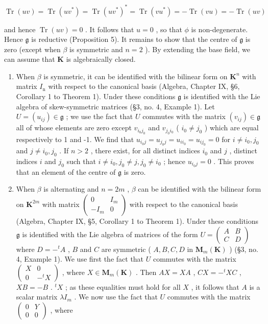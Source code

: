 \[
\operatorname{Tr} (u v) = \operatorname{Tr} (u v ^ {*}) = \operatorname{Tr} (u v ^ {*}) ^ {*} = \operatorname{Tr} (v u ^ {*}) = - \operatorname{Tr} (v u) = - \operatorname{Tr} (u v)
\]

and hence \(\operatorname{Tr}(u v) = 0\) . It follows that \(u = 0\) , so that \(\phi\) is non-degenerate. Hence \(\mathfrak{g}\) is reductive (Proposition 5). It remains to show that the centre of \(\mathfrak{g}\) is zero (except when \(\beta\) is symmetric and \(n = 2\) ). By extending the base field, we can assume that \(\mathbf{K}\) is algebraically closed.

\begin{enumerate}
\def\labelenumi{(\alph{enumi})}
\item
  When \(\beta\) is symmetric, it can be identified with the bilinear form on \(\mathbf{K}^n\) with matrix \(I_{\mathrm{n}}\) with respect to the canonical basis (Algebra, Chapter IX, §6, Corollary 1 to Theorem 1). Under these conditions \(\mathfrak{g}\) is identified with the Lie algebra of skew-symmetric matrices (§3, no. 4, Example 1). Let \(U = (u_{ij}) \in \mathfrak{g}\) ; we use the fact that \(U\) commutes with the matrix \((v_{ij}) \in \mathfrak{g}\) all of whose elements are zero except \(v_{i_0j_0}\) and \(v_{j_0i_0}\) ( \(i_0 \neq j_0\) ) which are equal respectively to 1 and -1. We find that \(u_{i_0j} = u_{j_0j} = u_{ii_0} = u_{ij_0} = 0\) for \(i \neq i_0, j_0\) and \(j \neq i_0, j_0\) . If \(n > 2\) , there exist, for all distinct indices \(i_0\) and \(j\) , distinct indices \(i\) and \(j_0\) such that \(i \neq i_0, j_0 \neq j, j_0 \neq i_0\) ; hence \(u_{i_0j} = 0\) . This proves that an element of the centre of \(\mathfrak{g}\) is zero.
\item
  When \(\beta\) is alternating and \(n = 2m\) , \(\beta\) can be identified with the bilinear form on \(\mathbf{K}^{2m}\) with matrix \(\left( \begin{array}{cc}0 & I_m \\ -I_m & 0 \end{array} \right)\) with respect to the canonical basis (Algebra, Chapter IX, §5, Corollary 1 to Theorem 1). Under these conditions \(\mathfrak{g}\) is identified with the Lie algebra of matrices of the form \(U = \left( \begin{array}{cc}A & B\\ C & D \end{array} \right)\) where \(D = -^t A\) , \(B\) and \(C\) are symmetric ( \(A, B, C, D\) in \(\mathbf{M}_m(\mathbf{K})\) ) (§3, no. 4, Example 1). We use first the fact that \(U\) commutes with the matrix \(\left( \begin{array}{cc}X & 0 \\ 0 & -^t X \end{array} \right)\) , where \(X \in \mathbf{M}_m(\mathbf{K})\) . Then \(AX = X A\) , \(CX = -^t XC\) , \(XB = -B\) . \(^t X\) ; as these equalities must hold for all \(X\) , it follows that \(A\) is a scalar matrix \(\lambda I_m\) . We now use the fact that \(U\) commutes with the matrix \(\left( \begin{array}{cc}0 & Y \\ 0 & 0 \end{array} \right)\) , where

\end{enumerate}
